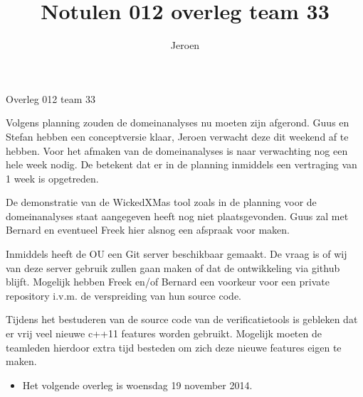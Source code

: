 \documentclass{article}
\title{Notulen 012 overleg team 33}
\author{Jeroen}
\begin{document}

\begin{Minutes}{Overleg 012 team 33}

\maketitle%


Volgens planning zouden de domeinanalyses nu moeten zijn afgerond. Guus en Stefan
hebben een conceptversie klaar, Jeroen verwacht deze dit weekend af te hebben.
Voor het afmaken van de domeinanalyses is naar verwachting nog een hele week nodig.
De betekent dat er in de planning inmiddels een vertraging van 1 week is opgetreden.


De demonstratie van de WickedXMas tool zoals in de planning voor de domeinanalyses
staat aangegeven heeft nog niet plaatsgevonden. Guus zal met Bernard en eventueel
Freek hier alsnog een afspraak voor maken.


Inmiddels heeft de OU een Git server beschikbaar gemaakt. De vraag is of wij van
deze server gebruik zullen gaan maken of dat de ontwikkeling via github blijft.
Mogelijk hebben Freek en/of Bernard een voorkeur voor een private repository i.v.m.
de verspreiding van hun source code.


Tijdens het bestuderen van de source code van de verificatietools is gebleken dat
er vrij veel nieuwe c++11 features worden gebruikt. Mogelijk moeten de teamleden
hierdoor extra tijd besteden om zich deze nieuwe features eigen te maken.


\begin{itemize}
 \item Het volgende overleg is woensdag 19 november 2014. 
\end{itemize}


\end{Minutes}
\end{document}
